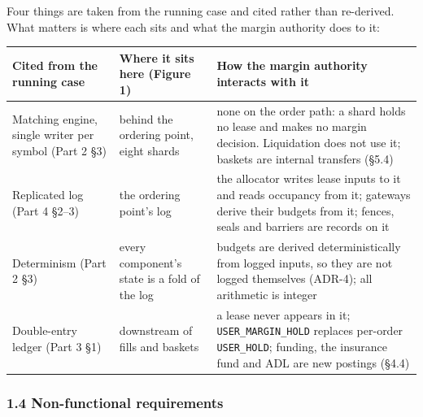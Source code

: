 \documentclass[10pt,a4paper]{article}
\newcounter{none}  %
\begin{document}
Four things are taken from the running case and cited rather than re-derived.
What matters is where each sits and what the margin authority does to it:

{\def\LTcaptype{none} %
\begin{longtable}[]{@{}
  >{\raggedright\arraybackslash}p{}
  >{\raggedright\arraybackslash}p{}
  >{\raggedright\arraybackslash}p{}@{}}
\toprule\noalign{}
\begin{minipage}[b]{\linewidth}\raggedright
Cited from the running case
\end{minipage} & \begin{minipage}[b]{\linewidth}\raggedright
Where it sits here (Figure 1)
\end{minipage} & \begin{minipage}[b]{\linewidth}\raggedright
How the margin authority interacts with it
\end{minipage} \\
\midrule\noalign{}
\endhead
\bottomrule\noalign{}
\endlastfoot
Matching engine, single writer per symbol (Part 2 §3) & behind the ordering point, eight shards & none on the order path: a shard holds no lease and makes no margin decision. Liquidation does not use it; baskets are internal transfers (§5.4) \\
Replicated log (Part 4 §2--3) & the ordering point's log & the allocator writes lease inputs to it and reads occupancy from it; gateways derive their budgets from it; fences, seals and barriers are records on it \\
Determinism (Part 2 §3) & every component's state is a fold of the log & budgets are derived deterministically from logged inputs, so they are not logged themselves (ADR-4); all arithmetic is integer \\
Double-entry ledger (Part 3 §1) & downstream of fills and baskets & a lease never appears in it; \texttt{USER\_MARGIN\_HOLD} replaces per-order \texttt{USER\_HOLD}; funding, the insurance fund and ADL are new postings (§4.4) \\
\end{longtable}
}

\subsubsection{1.4 Non-functional requirements}\label{non-functional-requirements}
\end{document}
